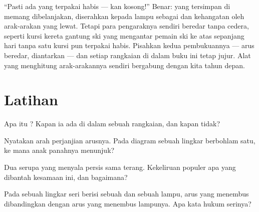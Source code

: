 \begin{remark}\label{rem:g7:circuits-series-parallel:whyhard}
``Pasti ada yang terpakai habis ---  kan kosong!'' Benar:
\emph{} yang tersimpan di  memang dibelanjakan,
diserahkan kepada lampu sebagai  dan kehangatan oleh arak-arakan
yang lewat. Tetapi para pengaraknya sendiri beredar tanpa cedera,
seperti kursi kereta gantung ski yang mengantar pemain ski ke atas
sepanjang hari tanpa satu kursi pun terpakai habis. Pisahkan kedua
pembukuannya --- arus beredar,  diantarkan --- dan setiap
rangkaian di dalam buku ini tetap jujur. Alat yang menghitung
arak-arakannya sendiri bergabung dengan kita tahun depan.
\end{remark}

\section{Latihan}

\begin{exercise}[$\star$]\label{exo:g7:circuits-series-parallel:1}
Apa itu ? Kapan ia ada di dalam sebuah rangkaian, dan
kapan tidak?
\end{exercise}

\begin{exercise}[$\star$]\label{exo:g7:circuits-series-parallel:2}
Nyatakan arah perjanjian arusnya. Pada diagram sebuah lingkar
berbohlam satu, ke mana anak panahnya menunjuk?
\end{exercise}

\begin{exercise}[$\star$]\label{exo:g7:circuits-series-parallel:3}
Dua  serupa yang  menyala persis sama terang.
Kekeliruan populer apa yang dibantah kesamaan ini, dan bagaimana?
\end{exercise}

\begin{exercise}[$\star$]\label{exo:g7:circuits-series-parallel:4}
Pada sebuah lingkar seri berisi sebuah  dan sebuah lampu, arus
yang menembus  dibandingkan dengan arus yang menembus lampunya.
Apa kata hukum serinya?
\end{exercise}

